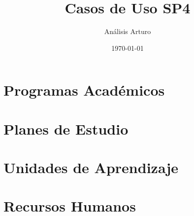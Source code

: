 \documentclass[12pt]{report}
\title{Casos de Uso SP4}
\author{Análisis Arturo}
\date{\today}
\begin{document}
\maketitle
\thispagestyle{empty}
\tableofcontents
\listoffigures


\chapter{Programas Académicos}



\chapter{Planes de Estudio}





\chapter{Unidades de Aprendizaje}


\chapter{Recursos Humanos}




\end{document}
